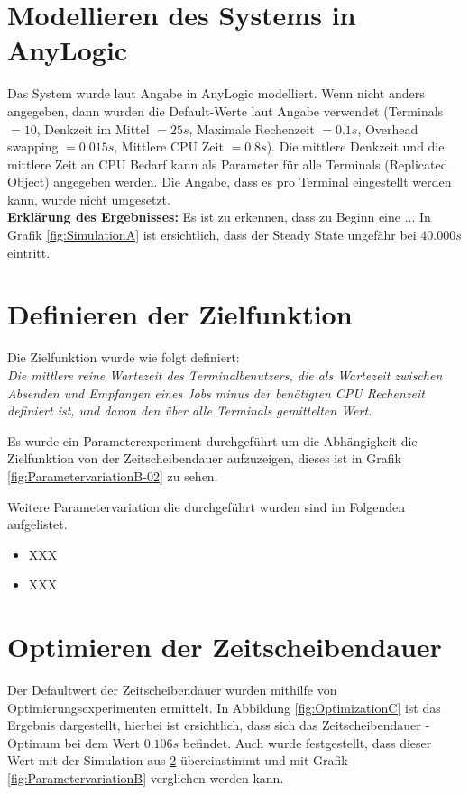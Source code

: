 \documentclass[
a4paper,   
headsepline, 
fleqn,     
11pt
]{scrartcl}
\begin{document}

\section{Modellieren des Systems in AnyLogic}
Das System wurde laut Angabe in AnyLogic modelliert. Wenn nicht anders angegeben, dann wurden die Default-Werte laut Angabe verwendet (Terminals $=10$, Denkzeit im Mittel $=25s$, Maximale Rechenzeit $=0.1s$, Overhead swapping $=0.015s$, Mittlere CPU Zeit $=0.8s$).
Die mittlere Denkzeit und die mittlere Zeit an CPU Bedarf kann als Parameter für alle Terminals (Replicated Object) angegeben werden. Die Angabe, dass es pro Terminal eingestellt werden kann, wurde nicht umgesetzt. \\

\textbf{Erklärung des Ergebnisses:} Es ist zu erkennen, dass zu Beginn eine ...
In Grafik \ref{fig:SimulationA} ist ersichtlich, dass der Steady State ungefähr bei $40.000s$ eintritt.

\section{Definieren der Zielfunktion}
\label{sec:DefinitionTargetFunction}
Die Zielfunktion wurde wie folgt definiert: \\
\textit{Die mittlere reine Wartezeit des Terminalbenutzers, die als Wartezeit zwischen Absenden und Empfangen eines Jobs minus der benötigten CPU Rechenzeit definiert ist, und davon den über alle Terminals gemittelten Wert.}

Es wurde ein Parameterexperiment durchgeführt um die Abhängigkeit die Zielfunktion von der Zeitscheibendauer aufzuzeigen, dieses ist in Grafik \ref{fig:ParametervariationB-02} zu sehen.

Weitere Parametervariation die durchgeführt wurden sind im Folgenden aufgelistet.

\begin{itemize}
	\item XXX
	\item XXX
\end{itemize}

\section{Optimieren der Zeitscheibendauer}
Der Defaultwert der Zeitscheibendauer wurden mithilfe von Optimierungsexperimenten ermittelt. In Abbildung \ref{fig:OptimizationC} ist das Ergebnis dargestellt, hierbei ist ersichtlich, dass sich das Zeitscheibendauer - Optimum bei dem Wert $0.106s$ befindet. Auch wurde festgestellt, dass dieser Wert mit der Simulation aus \ref{sec:DefinitionTargetFunction} übereinstimmt und mit Grafik \ref{fig:ParametervariationB} verglichen werden kann.
\end{document}
